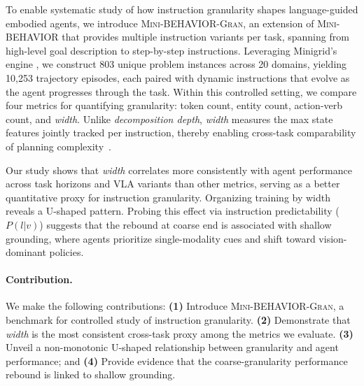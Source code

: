 \documentclass[11pt]{article}
\begin{document}

To enable systematic study of how instruction granularity shapes language-guided embodied agents, we introduce \textsc{Mini-BEHAVIOR-Gran}, an extension of \textsc{Mini-BEHAVIOR} \citep{jin2023minibehavior} that provides multiple instruction variants per task, spanning from high-level goal description to step-by-step instructions. Leveraging Minigrid's engine \citep{chevalier-boisvert2023minigrid}, we construct 803 unique problem instances across 20 domains, yielding 10,253 trajectory episodes, each paired with dynamic instructions that evolve as the agent progresses through the task. 
Within this controlled setting, we compare four metrics for quantifying granularity: token count, entity count, action-verb count, and \emph{width}. Unlike \emph{decomposition depth}, \emph{width} measures the max state features jointly tracked per instruction, thereby enabling cross-task comparability of planning complexity~\citep{DBLP:conf/aaai/BonetFG19,DBLP:journals/jair/DrexlerSG24}.

Our study shows that \emph{width} correlates more consistently with agent performance across task horizons and VLA variants than other metrics, serving as a better quantitative proxy for instruction granularity. Organizing training by width reveals a U-shaped pattern. Probing this effect via instruction predictability ($P(l|v)$) suggests that the rebound at coarse end is associated with shallow grounding, where agents prioritize single-modality cues and shift toward vision-dominant policies.

\paragraph{Contribution.} We make the following contributions: \textbf{(1)} Introduce \textsc{Mini-BEHAVIOR-Gran}, a benchmark for controlled study of instruction granularity. \textbf{(2)} Demonstrate that \emph{width} is the most consistent cross-task proxy among the metrics we evaluate. \textbf{(3)} Unveil a non-monotonic U-shaped relationship between granularity and agent performance; and \textbf{(4)} Provide evidence that the coarse-granularity performance rebound is linked to shallow grounding.
\end{document}
